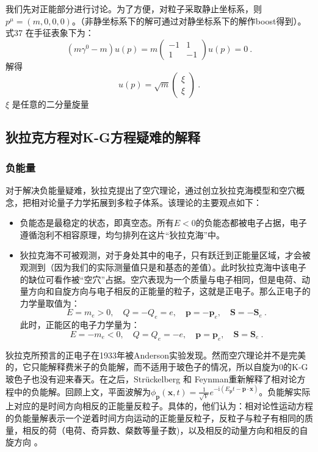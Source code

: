 我们先对正能部分进行讨论。为了方便，对粒子采取静止坐标系，则 $p^\mu=(m,0,0,0)$。（非静坐标系下的解可通过对静坐标系下的解作boost得到）。式37 在手征表象下为：
\begin{equation}
\left(m \gamma^{0}-m\right) u\left(p\right)=m\left(\begin{array}{rr}
-1 & 1 \\
1 & -1
\end{array}\right) u\left(p\right)=0~.
\end{equation}
解得\begin{equation}\label{eq_qed4_25}
u\left(p\right)=\sqrt{m}\left(\begin{array}{l}
\xi \\
\xi
\end{array}\right)~.
\end{equation}
$\xi$ 是任意的二分量旋量 
\subsection{狄拉克方程对K-G方程疑难的解释}
\subsubsection{负能量}
对于解决负能量疑难，狄拉克提出了空穴理论，通过创立狄拉克海模型和空穴概念，把相对论量子力学拓展到多粒子体系。该理论的主要观点如下：
\begin{itemize}
\item  负能态是最稳定的状态，即真空态。所有$E<0$的负能态都被电子占据，电子遵循泡利不相容原理，均匀排列在这片“狄拉克海”中。
\item 狄拉克海不可被观测，对于身处其中的电子，只有跃迁到正能量区域，才会被观测到（因为我们的实际测量值只是和基态的差值）。此时狄拉克海中该电子的缺位可看作被“空穴”占据。空穴表现为一个质量与电子相同，但是电荷、动量方向和自旋方向与电子相反的正能量的粒子，这就是正电子。那么正电子的力学量取值为：
\begin{equation}
E  =  m_{e}>0, \quad Q  =  -Q_{e}  =  e, \quad \boldsymbol{p}  =  -\boldsymbol{p}_{e},  \quad \boldsymbol S  =  -\boldsymbol{S}_{e}~.
\end{equation}
此时，正能区的电子力学量为：
\begin{equation}
E  =  -m_{e}<0, \quad Q  =  Q_{e}  =  -e, \quad \boldsymbol{p}  =  \boldsymbol{p}_{e}, \quad \boldsymbol S  =  \boldsymbol S_{e}~.
\end{equation}
\end{itemize}
狄拉克所预言的正电子在1933年被Anderson实验发现。然而空穴理论并不是完美的，它只能解释费米子的负能解，而不适用于玻色子的情况，所以自旋为0的K-G玻色子也没有迎来春天。在之后，Strückelberg 和 Feynman重新解释了相对论方程中的负能解。回顾上文，平面波解为$\phi_{\boldsymbol{p}}(\boldsymbol{x}, t)=\frac{1}{\sqrt{V}} e^{-\mathrm{i}\left(E_{\boldsymbol{p}} t-\boldsymbol{p} \cdot \boldsymbol{x}\right)}$。负能解实际上对应的是时间方向相反的正能量反粒子。具体的，他们认为：相对论性运动方程的负能量解表示一个逆着时间方向运动的正能量反粒子，反粒子与粒子有相同的质量，相反的荷（电荷、奇异数、粲数等量子数)，以及相反的动量方向和相反的自旋方向
。
